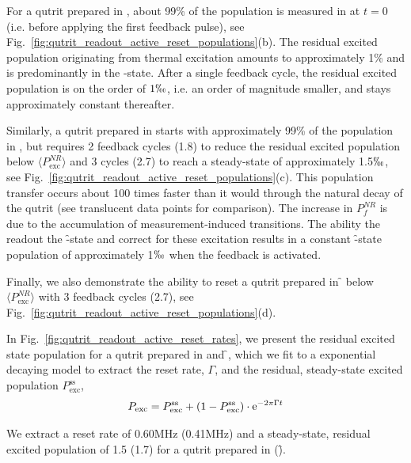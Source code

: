 For a qutrit prepared in \g, about 99\% of the population is measured in \g{} at $t=0$ (i.e. before applying the first feedback pulse), see Fig.~\ref{fig:qutrit_readout_active_reset_populations}(b). The residual excited population originating from thermal excitation amounts to approximately 1\% and is predominantly in the \e-state. After a single feedback cycle, the residual excited population is on the order of $1\permil$, i.e. an order of magnitude smaller, and stays approximately constant thereafter.

Similarly, a qutrit prepared in \e{} starts with approximately 99\% of the population in \e, but requires 2 feedback cycles (1.8\us) to reduce the residual excited population below $\langle P_{\textrm{exc}}^{NR}\rangle$  and 3 cycles (2.7\us) to reach a steady-state of approximately 1.5$\permil$, see Fig.~\ref{fig:qutrit_readout_active_reset_populations}(c). This population transfer occurs about 100 times faster than it would through the natural decay of the qutrit (see translucent data points for comparison). The increase in $P_f^{NR}$ is due to the accumulation of measurement-induced transitions. The ability the readout the \f-state and correct for these excitation results in a constant \f-state population of approximately 1$\permil$ when the feedback is activated.

Finally, we also demonstrate the ability to reset a qutrit prepared in \f{} below $\langle P_{\textrm{exc}}^{NR}\rangle$ with 3 feedback cycles (2.7\us), see Fig.~\ref{fig:qutrit_readout_active_reset_populations}(d).

In Fig.~\ref{fig:qutrit_readout_active_reset_rates}, we present the residual excited state population for a qutrit prepared in \e{} and \f{}, which we fit to a exponential decaying model to extract the reset rate, $\Gamma$, and the residual, steady-state excited population $P_{\textrm{exc}}^{\textrm{ss}}$,
\begin{equation}\label{eq:qutrit_readout_active_reset_rate_model}
    P_{\textrm{exc}} = P_{\textrm{exc}}^{\textrm{ss}} + (1-P_{\textrm{exc}}^{\textrm{ss}}) \cdot \mathrm e^{-2\pi\Gamma t}
\end{equation}

We extract a reset rate of 0.60\unit{MHz} (0.41\unit{MHz}) and a steady-state, residual excited population of 1.5\unit{\permil} (1.7\unit{\permil}) for a qutrit prepared in \e{} (\f). 

